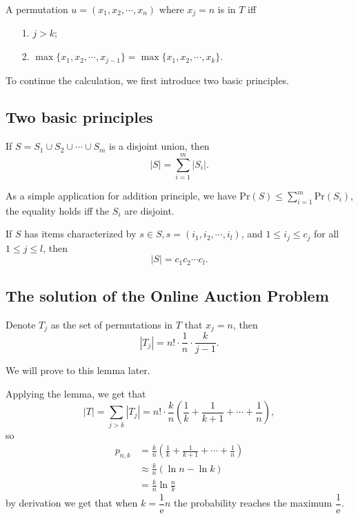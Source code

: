 \documentclass{scribe}
\theoremstyle{plain}
\theoremstyle{empty}
\begin{document}
A permutation $u=(x_1,x_2,\cdots,x_n)$ where $x_j=n$ is in $T$ iff
\begin{itemize}
    \item[1.] $j>k$;
    \item[2.] $\max\{x_1,x_2,\cdots,x_{j-1}\}=\max\{x_1,x_2,\cdots,x_{k}\}$.
\end{itemize}

To continue the calculation, we first introduce two basic principles.

\subsection{Two basic principles}

\begin{theorem}
    If $S=S_1\cup S_2\cup\cdots\cup S_m$ is a disjoint union, then
    $$|S|=\sum_{i=1}^m|S_i|.$$
\end{theorem}

\begin{remark}
    As a simple application for addition principle, we have $\text{Pr}(S)\le\sum\limits_{i=1}^m \text{Pr}(S_i)$, the equality holds iff the $S_i$ are disjoint.
\end{remark}

\begin{theorem}
    If $S$ has items characterized by $s\in S, s=(i_1,i_2,\cdots,i_l)$, and $1\le i_j\le c_j$ for all $1\le j\le l$, then
    $$|S|=c_1c_2\cdots c_l.$$
\end{theorem}

\subsection{The solution of the Online Auction Problem}

\begin{lemma} \label{lmm:num-permutation}
    Denote $T_j$ as the set of permutations in $T$ that $x_j=n$, then
    $$|T_j|=n!\cdot\frac{1}{n}\cdot\frac{k}{j-1}.$$
\end{lemma}

We will prove to this lemma later. 

Applying the lemma, we get that
$$|T|=\sum_{j>k}|T_j|=n!\cdot\frac{k}{n}\left(\frac{1}{k}+\frac{1}{k+1}+\cdots+\frac{1}{n}\right),$$
so
\begin{align*}
    p_{n,k}&=\frac{k}{n}\left(\frac{1}{k}+\frac{1}{k+1}+\cdots+\frac{1}{n}\right) \\
    & \approx\frac{k}{n}\left(\ln n-\ln k\right) \\
    & =\frac{k}{n}\ln \frac{n}{k}
\end{align*}
by derivation we get that when $k=\dfrac{1}{\text{e}}n$ the probability reaches the maximum $\dfrac{1}{\text{e}}$.
\end{document}

